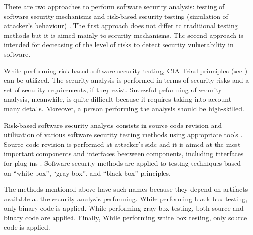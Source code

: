 %
There are two approaches to perform software security analysis: testing of software security mechanisms and risk-based security testing (simulation of \An attacker's behaviour) . 
%
The first approach does not differ to traditional testing methods but it is aimed mainly to security mechanisms. 
%
The second approach is intended for decreasing of the level of risks to detect security vulnerability in software. 

%
While performing risk-based software security testing, CIA Triad principles (see ) can be utilized. 
%
The security analysis is performed in terms of security risks and a set of security requirements, if they exist. 
%
Sucessful peforming of security analysis, meanwhile, is quite difficult because it requires taking into account many details. 
%
Moreover, a person performing the analysis should be high-skilled. 

%
Risk-based software security analysis consists in source code revision and utilization of various software security testing methods using appropriate tools . 
%
Source code revision is performed at \An attacker's side and it is aimed at the most important components and interfaces beetween components, including interfaces for plug-ins . 
%
Software security methods are applied to testing techniques based on ``white box'', ``gray box'', and ``black box'' principles. 

%
The methods mentioned above have such names because they depend on artifacts available at the security analysis performing. 
%
While performing black box testing, only binary code is applied. 
%
While performing gray box testing, both source and binary code are applied. 
%
Finally, While performing white box testing, only source code is applied. 
